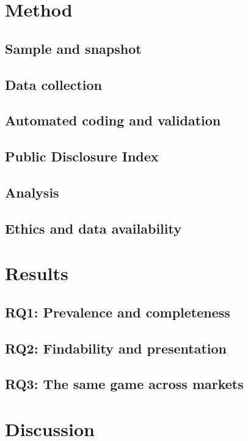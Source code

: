 \documentclass[acmsmall,review,anonymous]{acmart}
\begin{document}
\section{Method}
\subsection{Sample and snapshot}
\subsection{Data collection}
\subsection{Automated coding and validation}
\subsection{Public Disclosure Index}
\subsection{Analysis}
\subsection{Ethics and data availability}

\section{Results}
\subsection{RQ1: Prevalence and completeness}
\subsection{RQ2: Findability and presentation}
\subsection{RQ3: The same game across markets}

\section{Discussion}
\end{document}
